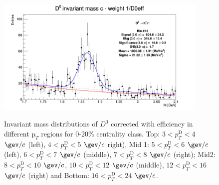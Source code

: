 \begin{figure}[!htp]
{\includegraphics[width=0.6\linewidth, height=5.6cm]{figuresVsCent/Dzero/MassPlots/020/InvMassDistributions_Dzero_Bins12to12.png}}

\caption{Invariant mass distributions of $D^0$ corrected with efficiency in different $\text{p}_T$ regions for 0-20$\%$ centrality class. Top: $3< p_{T}^{\text{D}}< 4$ $\gev/c$ (left), $4< p_{T}^{\text{D}}< 5$ $\gev/c$ right), Mid 1: $5< p_{T}^{\text{D}}< 6$ $\gev/c$ (left), $6 < p_{T}^{\text{D}} < 7$ $\gev/c$ (middle), $7< p_{T}^{\text{D}}< 8$ $\gev/c$ (right); Mid2: $8< p_{T}^{\text{D}}< 10$ $\gev/c$, $10< p_{T}^{\text{D}}< 12$ $\gev/c$  (middle), $12 < p_{T}^{\text{D}}< 16$ $\gev/c$  (right) and Bottom: $16<p_{T}^{\text{D}}< 24$ $\gev/c$.}
\label{fig:InvMassD0020}
\end{figure}



